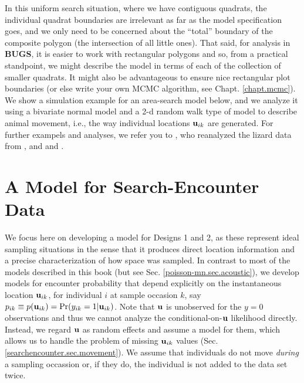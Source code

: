 In this uniform search  situation, where we have contiguous quadrats,  the
individual quadrat boundaries are irrelevant as far as the model
specification goes,  and we
only need to be concerned about the ``total'' boundary of the
composite polygon (the intersection of all little ones). That said,
for analysis in {\bf BUGS}, it is easier to work with rectangular
polygons and so, from a practical standpoint, we might describe the
model in terms of each of the collection of smaller quadrats. It might also be advantageous
to ensure nice rectangular plot boundaries (or else write your own
MCMC algorithm, see Chapt. \ref{chapt.mcmc}).  We show a simulation
example for an area-search model below, and we analyze it %
using a
bivariate normal model and a 2-d random walk type of model to describe
animal movement, i.e., the way individual locations ${\bf u}_{ik}$ are
generated. For further exampels and analyses, we refer you to
\citet{royle_dorazio:2008}, who reanalyzed the lizard data from
\citet{royle_young:2008}, and \citet{efford:2011ecol} and
\citet{marques_etal:2011}.


\section{A Model for Search-Encounter Data}

We focus here on developing a model for Designs 1 and 2, as these
represent ideal sampling situations in the sense that it produces
direct location information and a precise characterization of how
space was sampled. 
 In contrast to most of the models
described in this book (but see Sec. \ref{poisson-mn.sec.acoustic}), we
develop models for encounter probability that depend explicitly on the
instantaneous location ${\bf u}_{ik}$, for individual $i$ at sample
occasion $k$, say $p_{ik} \equiv p({\bf u}_{ik}) = \Pr(y_{ik}=1|{\bf
  u}_{ik})$.  Note that ${\bf u}$ is unobserved for the $y=0$
observations and thus we cannot analyze the conditional-on-${\bf u}$
likelihood directly. Instead, we regard ${\bf u}$ as random effects
and assume a model for them, which allows us to handle the
problem of missing ${\bf u}_{ik}$ values
(Sec. \ref{searchencounter.sec.movement}).
We assume that individuals do not move {\it during} a sampling
occassion or, if they do, the individual is not added to the data set
twice. 

